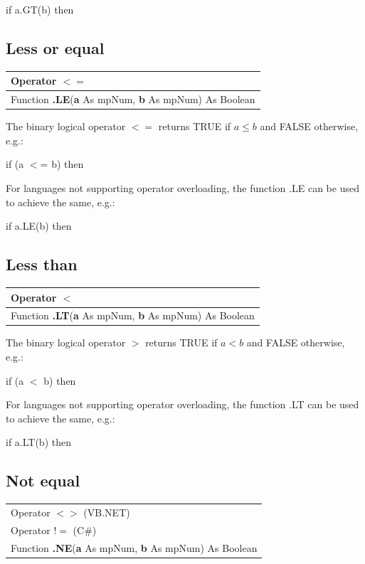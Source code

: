 \textsf{if a.GT(b) then}






\subsection{Less or equal}
\begin{tabular}{p{481pt}}
	\toprule
	\textsf{Operator $\boldsymbol{<=}$}\index{Multiprecision Functions!=} \\
	\midrule
	\textsf{Function \textbf{.LE}(\textbf{a} As mpNum, \textbf{b} As mpNum) As Boolean}\index{Multiprecision Functions!.LE} \\
	\bottomrule
\end{tabular}

\vspace{0.3cm}
The binary logical operator $\boldsymbol{<=}$ returns TRUE if  $a \leq b$ and FALSE otherwise, e.g.: 

\textsf{if (a $<$= b) then}

For languages not supporting operator overloading, the function \textsf{.LE} can be used to achieve the same, e.g.: 

\textsf{if a.LE(b) then}






\subsection{Less than}
\begin{tabular}{p{481pt}}
	\toprule
	\textsf{Operator $\boldsymbol{<}$}\index{Multiprecision Functions!=} \\
	\midrule
	\textsf{Function \textbf{.LT}(\textbf{a} As mpNum, \textbf{b} As mpNum) As Boolean}\index{Multiprecision Functions!.LT} \\
	\bottomrule
\end{tabular}

\vspace{0.3cm}
The binary logical operator $\boldsymbol{>}$ returns TRUE if  $a < b$ and FALSE otherwise, e.g.: 

\textsf{if (a $<$ b) then}

For languages not supporting operator overloading, the function \textsf{.LT} can be used to achieve the same, e.g.: 

\textsf{if a.LT(b) then}




\subsection{Not equal}
\begin{tabular}{p{481pt}}
	\toprule
	\textsf{Operator $\boldsymbol{<>}$} (VB.NET)\index{Multiprecision Functions!=} \\
	\textsf{Operator $\boldsymbol{!=}$} (C\#)\index{Multiprecision Functions!=} \\
	\midrule
	\textsf{Function \textbf{.NE}(\textbf{a} As mpNum, \textbf{b} As mpNum) As Boolean}\index{Multiprecision Functions!.NE} \\
	\bottomrule
\end{tabular}

